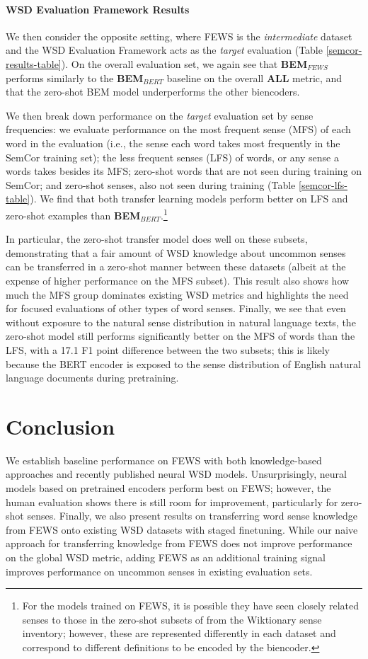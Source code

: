 \documentclass[11pt,a4paper]{article}
\begin{document}
\paragraph{WSD Evaluation Framework Results} We then consider the opposite setting, where FEWS is the \textit{intermediate} dataset and the WSD Evaluation Framework acts as the \textit{target} evaluation (Table \ref{semcor-results-table}). On the overall evaluation set, we again see that \textbf{BEM$_{FEWS}$} performs similarly to the \textbf{BEM$_{BERT}$} baseline on the overall \textbf{ALL} metric, and that the zero-shot BEM model underperforms the other biencoders. 

We then break down performance on the \textit{target} evaluation set by sense frequencies: we evaluate performance on the most frequent sense (MFS) of each word in the evaluation (i.e., the sense each word takes most frequently in the SemCor training set); the less frequent senses (LFS) of words, or any sense a words takes besides its MFS; zero-shot words that are not seen during training on SemCor; and zero-shot senses, also not seen during training (Table \ref{semcor-lfs-table}).  
We find that both transfer learning models perform better on LFS and zero-shot examples than \textbf{BEM$_{BERT}$}.\footnote{For the models trained on FEWS, it is possible they have seen closely related senses to those in the zero-shot subsets of from the Wiktionary sense inventory; however, these are represented differently in each dataset and correspond to different definitions to be encoded by the biencoder.}

In particular, the zero-shot transfer model does well on these subsets, demonstrating that a fair amount of WSD knowledge about uncommon senses can be transferred in a zero-shot manner between these datasets (albeit at the expense of higher performance on the MFS subset). This result also shows how much the MFS group dominates existing WSD metrics and highlights the need for focused evaluations of other types of word senses. Finally, we see that even without exposure to the natural sense distribution in natural language texts, the zero-shot model still performs significantly better on the MFS of words than the LFS, with a 17.1 F1 point difference between the two subsets; this is likely because the BERT encoder is exposed to the sense distribution of English natural language documents during pretraining.

\section{Conclusion}
We establish baseline performance on FEWS with both knowledge-based approaches and recently published neural WSD models. Unsurprisingly, neural models based on pretrained encoders perform best on FEWS; however, the human evaluation shows there is still room for improvement, particularly for zero-shot senses. Finally, we also present results on transferring word sense knowledge from FEWS onto existing WSD datasets with staged finetuning. While our naive approach for transferring knowledge from FEWS does not improve performance on the global WSD metric, adding FEWS as an additional training signal improves performance on uncommon senses in existing evaluation sets. 
\end{document}
